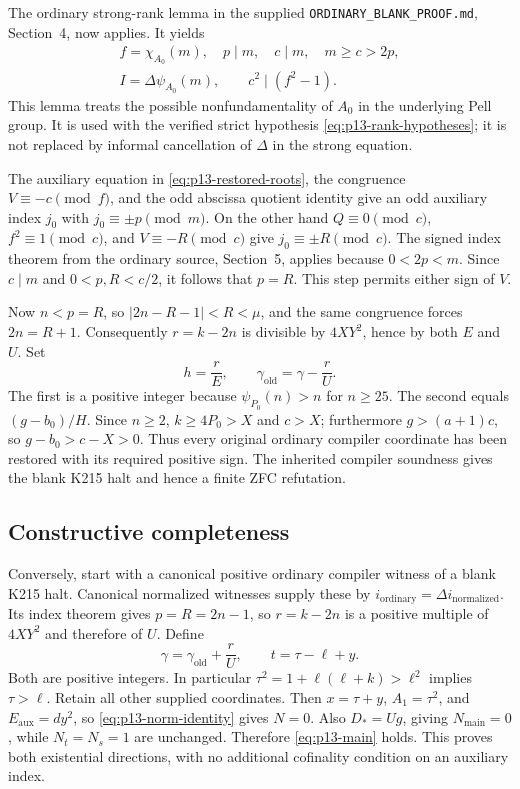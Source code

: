 The ordinary strong-rank lemma in the supplied
\texttt{ORDINARY\_BLANK\_PROOF.md}, Section~4, now applies. It yields
\begin{equation}
 \begin{gathered}
 f=\chi_{A_0}(m),\quad p\mid m,\quad c\mid m,\quad m\ge c>2p,\\
 I=\Delta\psi_{A_0}(m),\qquad c^2\mid(f^2-1).
 \end{gathered}
 \label{eq:p13-strong-rank}
\end{equation}
This lemma treats the possible nonfundamentality of $A_0$ in the underlying
Pell group. It is used with the verified strict hypothesis
\eqref{eq:p13-rank-hypotheses}; it is not replaced by informal cancellation
of $\Delta$ in the strong equation.

The auxiliary equation in \eqref{eq:p13-restored-roots}, the congruence
$V\equiv-c\pmod f$, and the odd abscissa quotient identity give an odd
auxiliary index $j_0$ with $j_0\equiv\pm p\pmod m$.
On the other hand $Q\equiv0\pmod c$, $f^2\equiv1\pmod c$, and
$V\equiv-R\pmod c$ give $j_0\equiv\pm R\pmod c$.
The signed index theorem from the ordinary source, Section~5, applies
because $0<2p<m$. Since $c\mid m$ and $0<p,R<c/2$, it follows that
$p=R$. This step permits either sign of $V$.

Now $n<p=R$, so $|2n-R-1|<R<\mu$, and the same congruence forces
$2n=R+1$. Consequently $r=k-2n$ is divisible by $4XY^2$, hence by both
$E$ and $U$. Set
\[
 h=\frac rE,\qquad \gamma_{\mathrm{old}}=\gamma-\frac rU.
\]
The first is a positive integer because $\psi_{P_0}(n)>n$ for $n\ge25$.
The second equals $(g-b_0)/H$. Since $n\ge2$, $k\ge4P_0>X$ and $c>X$;
furthermore $g>(a+1)c$, so $g-b_0>c-X>0$.
Thus every original ordinary compiler coordinate has been restored with
its required positive sign. The inherited compiler soundness gives the
blank K215 halt and hence a finite ZFC refutation.

\subsection{Constructive completeness}

Conversely, start with a canonical positive ordinary compiler witness of
a blank K215 halt. Canonical normalized witnesses supply these by
$i_{\mathrm{ordinary}}=\Delta i_{\mathrm{normalized}}$.
Its index theorem gives $p=R=2n-1$, so $r=k-2n$ is a positive multiple
of $4XY^2$ and therefore of $U$. Define
\[
 \gamma=\gamma_{\mathrm{old}}+\frac rU,
 \qquad t=\tau-\ell+y.
\]
Both are positive integers. In particular
$\tau^2=1+\ell(\ell+k)>\ell^2$ implies $\tau>\ell$.
Retain all other supplied coordinates. Then $x=\tau+y$,
$A_1=\tau^2$, and $E_{\mathrm{aux}}=dy^2$, so
\eqref{eq:p13-norm-identity} gives $N=0$.
Also $D_*=Ug$, giving $N_{\mathrm{main}}=0$, while $N_t=N_s=1$
are unchanged. Therefore \eqref{eq:p13-main} holds.
This proves both existential directions, with no additional cofinality
condition on an auxiliary index.

